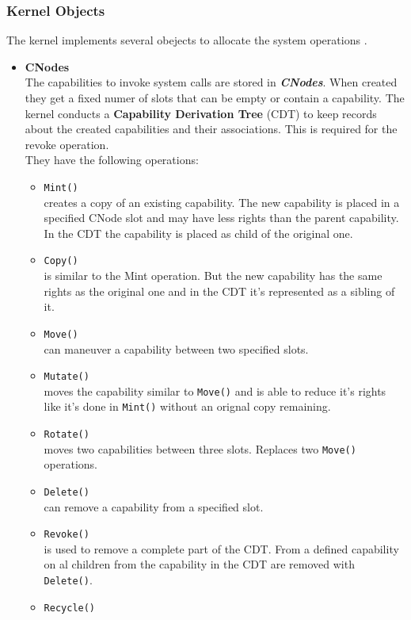 \documentclass[11pt,a4paper,twoside]{article}
\begin{document}
	\subsubsection{Kernel Objects}\label{sec:KernelObjects}
	The kernel implements several obejects to allocate the system operations \cite{Manual}.
	\begin{itemize}
	\item \textbf{CNodes} \\
	The capabilities to invoke system calls are stored in \textbf{\textit{CNodes}}. When created they get a fixed numer of slots that can be empty or contain a capability. 
	The kernel conducts a \textbf{Capability Derivation Tree} (CDT) to keep records about the created capabilities and their associations. This is required for the revoke operation. \\ 
	They have the following operations:
\begin{itemize}
\item \texttt{Mint()} \\
creates a copy of an existing capability. The new capability is placed in a specified CNode slot and may have less rights than the parent capability. In the CDT the capability is placed as child of the original one. 
\item \texttt{Copy()} \\
is similar to the Mint operation. But the new capability has the same rights as the original one and in the CDT it's represented as a sibling of it. 
\item \texttt{Move()} \\
can maneuver a capability between two specified slots. 
\item \texttt{Mutate()} \\
moves the capability similar to \texttt{Move()} and is able to reduce it's rights like it's done in \texttt{Mint()} without an orignal copy remaining.
\item \texttt{Rotate()} \\
moves two capabilities between three slots. Replaces two \texttt{Move()} operations. 
\item \texttt{Delete()} \\
can remove a capability from a specified slot.
\item \texttt{Revoke()} \\
is used to remove a complete part of the CDT. From a defined capability on al children from the capability in the CDT are removed with \texttt{Delete()}. 
\item \texttt{Recycle()} \\

\end{itemize}
\end{itemize}
\end{document}
